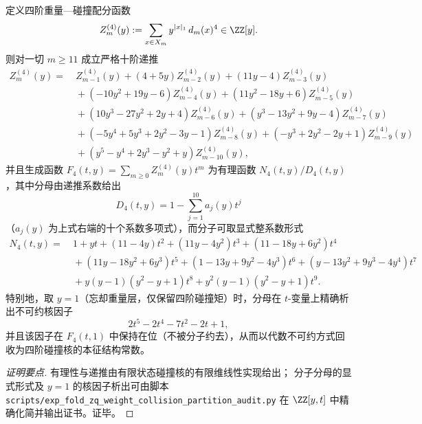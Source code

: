 \begin{conclusion}[\texorpdfstring{$(q=4)$}{(q=4)} 的重量—碰撞配分函数：十阶常系数递推与核多项式的在位回收]\label{con:xi-terminal-zm4-order10-rational}
定义四阶重量—碰撞配分函数
\[
Z_m^{(4)}(y):=\sum_{x\in X_m} y^{|x|_1}\,d_m(x)^4\in\ZZ[y].
\]
则对一切 \(m\ge 11\) 成立严格十阶递推
\[
\begin{aligned}
Z_m^{(4)}(y)=&\ Z_{m-1}^{(4)}(y)+(4+5y)Z_{m-2}^{(4)}(y)+(11y-4)Z_{m-3}^{(4)}(y)\\
&\ +(-10y^2+19y-6)Z_{m-4}^{(4)}(y)+(11y^2-18y+6)Z_{m-5}^{(4)}(y)\\
&\ +(10y^3-27y^2+2y+4)Z_{m-6}^{(4)}(y)+(y^3-13y^2+9y-4)Z_{m-7}^{(4)}(y)\\
&\ +(-5y^4+5y^3+2y^2-3y-1)Z_{m-8}^{(4)}(y)+(-y^3+2y^2-2y+1)Z_{m-9}^{(4)}(y)\\
&\ +(y^5-y^4+2y^3-y^2+y)Z_{m-10}^{(4)}(y),
\end{aligned}
\]
并且生成函数 \(F_4(t,y)=\sum_{m\ge 0}Z_m^{(4)}(y)t^m\) 为有理函数 \(N_4(t,y)/D_4(t,y)\)，其中分母由递推系数给出
\[
D_4(t,y)=1-\sum_{j=1}^{10}a_j(y)t^j
\]
（\(a_j(y)\) 为上式右端的十个系数多项式），而分子可取显式整系数形式
\[
\begin{aligned}
N_4(t,y)=&\ 1+yt+(11-4y)t^2+(11y-4y^2)t^3+(11-18y+6y^2)t^4\\
&\ +(11y-18y^2+6y^3)t^5+(1-13y+9y^2-4y^3)t^6+(y-13y^2+9y^3-4y^4)t^7\\
&\ +y(y-1)(y^2-y+1)t^8+y^2(y-1)(y^2-y+1)t^9.
\end{aligned}
\]
特别地，取 \(y=1\)（忘却重量层，仅保留四阶碰撞矩）时，分母在 \(t\)-变量上精确析出不可约核因子
\[
2t^5-2t^4-7t^2-2t+1,
\]
并且该因子在 \(F_4(t,1)\) 中保持在位（不被分子约去），从而以代数不可约方式回收为四阶碰撞核的本征结构常数。
\end{conclusion}
\begin{proof}[证明要点]
有理性与递推由有限状态碰撞核的有限维线性实现给出；
分子分母的显式形式及 \(y=1\) 的核因子析出可由脚本
\texttt{scripts/exp\_fold\_zq\_weight\_collision\_partition\_audit.py} 在 \(\ZZ[y,t]\) 中精确化简并输出证书。证毕。
\end{proof}

